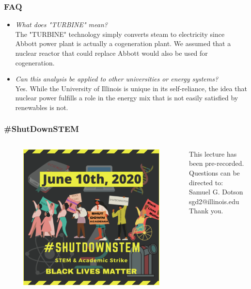 \documentclass[9pt]{beamer}
\begin{document}
\begin{frame}
  \frametitle{FAQ}
    \begin{itemize}
      \item \textit{What does "TURBINE" mean?}\\
      The "TURBINE" technology simply converts steam to electricity since Abbott
      power plant is actually a cogeneration plant. We assumed that a nuclear
      reactor that could replace Abbott would also be used for cogeneration.
      \item \textit{Can this analysis be applied to other universities or energy
      systems?}\\
      Yes. While the University of Illinois is unique in its self-reliance, the
      idea that nuclear power fulfills a role in the energy mix that is not easily
      satisfied by renewables is not.
    \end{itemize}
\end{frame}

\begin{frame}
  \frametitle{\#ShutDownSTEM}
  \begin{columns}
    \column[t]{5cm}
    \begin{figure}
      \centering
      \includegraphics[width=\textwidth]{shutdownstem.png}
    \end{figure}
    \column[t]{5cm}
    \vspace{2cm}
    \newline
      This lecture has been pre-recorded.\\
      Questions can be directed to:\\
      Samuel G. Dotson\\
      sgd2@illinois.edu\\
      Thank you.


  \end{columns}
\end{frame}

\end{document}
